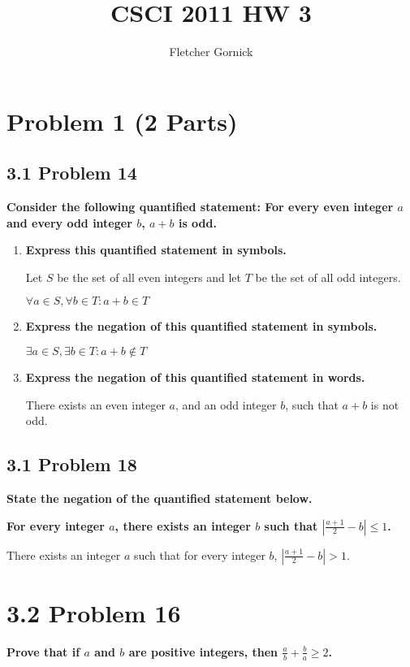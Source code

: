 \documentclass[10pt]{article}
\title{CSCI 2011 HW 3}
\author{Fletcher Gornick}
\def \n {\par \vspace{\baselineskip}}
\begin{document}
\maketitle

\section{Problem 1 (2 Parts)}
\subsection{3.1 Problem 14}
\textbf{Consider the following quantified statement: For every even integer $a$ and every odd integer
$b$, $a + b$ is odd.}

\begin{enumerate}[label=(\alph*)]
    
    \item \textbf{Express this quantified statement in symbols.}

        Let $S$ be the set of all even integers and let $T$ be the set of all odd integers.

        $\forall a \in S, \forall b \in T: a+b \in T$


    \item \textbf{Express the negation of this quantified statement in symbols.}

        $\exists a \in S, \exists b \in T: a+b \not\in T$
        

    \item \textbf{Express the negation of this quantified statement in words.}

        There exists an even integer $a$, and an odd integer $b$, such that $a+b$ is not odd.


\end{enumerate}



\subsection{3.1 Problem 18}
\textbf{State the negation of the quantified statement below.}

\textbf{For every integer $a$, there exists an integer $b$ such that $|\frac{a+1}{2} - b| \leq 1$.}

\n
There exists an integer $a$ such that for every integer $b$, $|\frac{a+1}{2} - b| > 1$.


\section{3.2 Problem 16}
\textbf{Prove that if $a$ and $b$ are positive integers, then $\frac{a}{b} + \frac{b}{a} \geq 2$.}
\end{document}
